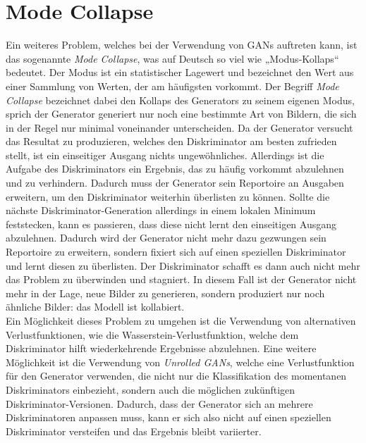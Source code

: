 \section{Mode Collapse}

\noindent Ein weiteres Problem, welches bei der Verwendung von \acp{GAN} auftreten kann, ist das sogenannte \textit{Mode Collapse}, was auf Deutsch so viel wie „Modus-Kollaps“ bedeutet. Der Modus ist ein statistischer Lagewert und bezeichnet den Wert aus einer Sammlung von Werten, der am häufigsten vorkommt. Der Begriff \textit{Mode Collapse} bezeichnet dabei den Kollaps des Generators zu seinem eigenen Modus, sprich der Generator generiert nur noch eine bestimmte Art von Bildern, die sich in der Regel nur minimal voneinander unterscheiden.  Da der Generator versucht das Resultat zu produzieren, welches den Diskriminator am besten zufrieden stellt, ist ein einseitiger Ausgang nichts ungewöhnliches. Allerdings ist die Aufgabe des Diskriminators ein Ergebnis, das zu häufig vorkommt abzulehnen und zu verhindern. Dadurch muss der Generator sein Reportoire an Ausgaben erweitern, um den Diskriminator weiterhin überlisten zu können. Sollte die nächste Diskriminator-Generation allerdings in einem lokalen Minimum feststecken, kann es passieren, dass diese nicht lernt den einseitigen Ausgang abzulehnen. Dadurch wird der Generator nicht mehr dazu gezwungen sein Reportoire zu erweitern, sondern fixiert sich auf einen speziellen Diskriminator und lernt diesen zu überlisten. Der Diskriminator schafft es dann auch nicht mehr das Problem zu überwinden und stagniert. In diesem Fall ist der Generator nicht mehr in der Lage, neue Bilder zu generieren, sondern produziert nur noch ähnliche Bilder: das Modell ist kollabiert. \\

\noindent Ein Möglichkeit dieses Problem zu umgehen ist die Verwendung von alternativen Verlustfunktionen, wie die Wasserstein-Verlustfunktion, welche dem Diskriminator hilft wiederkehrende Ergebnisse abzulehnen. Eine weitere Möglichkeit ist die Verwendung von \textit{Unrolled GANs}, welche eine Verlustfunktion für den Generator verwenden, die nicht nur die Klassifikation des momentanen Diskriminators einbezieht, sondern auch die möglichen zukünftigen Diskriminator-Versionen. Dadurch, dass der Generator sich an mehrere Diskriminatoren anpassen muss, kann er sich also nicht auf einen speziellen Diskriminator versteifen und das Ergebnis bleibt variierter.  \cite{training}

\newpage
